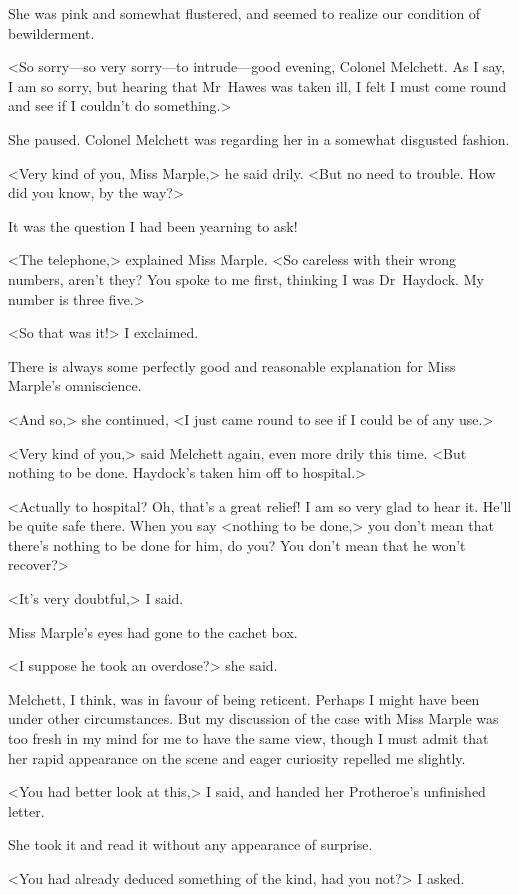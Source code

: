 She was pink and somewhat flustered, and seemed to realize our condition of bewilderment.

<So sorry—so very sorry—to intrude—good evening, Colonel Melchett. As I say, I am so sorry, but hearing that Mr~Hawes was taken ill, I felt I must come round and see if I couldn't do something.>

She paused. Colonel Melchett was regarding her in a somewhat disgusted fashion.

<Very kind of you, Miss Marple,> he said drily. <But no need to trouble. How did you know, by the way?>

It was the question I had been yearning to ask!

<The telephone,> explained Miss Marple. <So careless with their wrong numbers, aren't they? You spoke to me first, thinking I was Dr~Haydock. My number is three five.>

<So that was it!> I exclaimed.

There is always some perfectly good and reasonable explanation for Miss Marple's omniscience.

<And so,> she continued, <I just came round to see if I could be of any use.>

<Very kind of you,> said Melchett again, even more drily this time. <But nothing to be done. Haydock's taken him off to hospital.>

<Actually to hospital? Oh, that's a great relief! I am so very glad to hear it. He'll be quite safe there. When you say <nothing to be done,> you don't mean that there's nothing to be done for him, do you? You don't mean that he won't recover?>

<It's very doubtful,> I said.

Miss Marple's eyes had gone to the cachet box.

<I suppose he took an overdose?> she said.

Melchett, I think, was in favour of being reticent. Perhaps I might have been under other circumstances. But my discussion of the case with Miss Marple was too fresh in my mind for me to have the same view, though I must admit that her rapid appearance on the scene and eager curiosity repelled me slightly.

<You had better look at this,> I said, and handed her Protheroe's unfinished letter.

She took it and read it without any appearance of surprise.

<You had already deduced something of the kind, had you not?> I asked.


